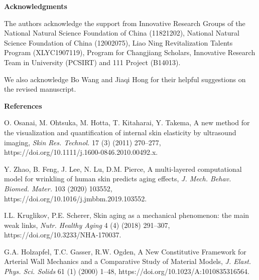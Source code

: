 \documentclass[11pt]{article}
\begin{document}
\vspace{0.5em}

\noindent\textbf{Acknowledgments}

\vspace{0.3em}

\noindent
The authors acknowledge the support from Innovative Research
Groups of the National Natural Science Foundation of China
(11821202), National Natural Science Foundation of China
(12002075), Liao Ning Revitalization Talents Program
(XLYC1907119), Program for Changjiang Scholars, Innovative
Research Team in University (PCSIRT) and 111 Project (B14013).

\noindent
We also acknowledge Bo Wang and Jiaqi Hong for their helpful
suggestions on the revised manuscript.

\vspace{0.5em}

\noindent\textbf{References}

\vspace{0.3em}

\begin{list}{}{%
  \setlength{\leftmargin}{2em}%
  \setlength{\itemindent}{-2em}%
  \setlength{\itemsep}{0.5em}%
  \setlength{\parsep}{0pt}%
}

\item [1] O. Osanai, M. Ohtsuka, M. Hotta, T. Kitaharai, Y.
Takema, A new method for the visualization and quantification
of internal skin elasticity by ultrasound imaging,
\emph{Skin Res. Technol.} 17 (3) (2011) 270--277,
https://doi.org/10.1111/j.1600-0846.2010.00492.x.

\item [2] Y. Zhao, B. Feng, J. Lee, N. Lu, D.M. Pierce, A
multi-layered computational model for wrinkling of human skin
predicts aging effects, \emph{J. Mech. Behav. Biomed. Mater.}
103 (2020) 103552, https://doi.org/10.1016/j.jmbbm.2019.103552.

\item [3] I.L. Kruglikov, P.E. Scherer, Skin aging as a
mechanical phenomenon: the main weak links, \emph{Nutr. Healthy
Aging} 4 (4) (2018) 291--307,
https://doi.org/10.3233/NHA-170037.

\item [4] G.A. Holzapfel, T.C. Gasser, R.W. Ogden, A New
Constitutive Framework for Arterial Wall Mechanics and a
Comparative Study of Material Models, \emph{J. Elast. Phys.
Sci. Solids} 61 (1) (2000) 1--48,
https://doi.org/10.1023/A:1010835316564.

\end{list}

\end{document}
